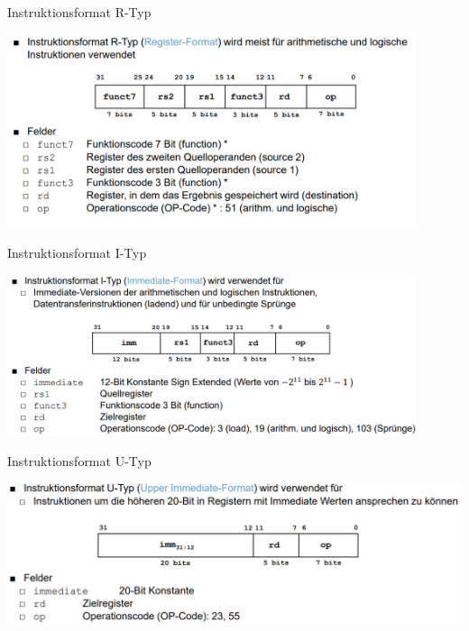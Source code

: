 \documentclass[
  german,            %
  aspectratio=169,    %
]{tumbeamer}
\begin{document}
\begin{frame}[c, fragile]{Instruktionsformat R-Typ}{}
	\begin{center}
		\includegraphics[width=0.9\textwidth]{w08_rtype_lv.png}
	\end{center}
\end{frame}

\begin{frame}[c, fragile]{Instruktionsformat I-Typ}{}
	\begin{center}
		\includegraphics[width=0.9\textwidth]{w08_itype_lv.png}
	\end{center}
\end{frame}

\begin{frame}[c, fragile]{Instruktionsformat U-Typ}{}
	\begin{center}
		\includegraphics[width=\textwidth]{w08_utype_lv.png}
	\end{center}
\end{frame}
\end{document}
